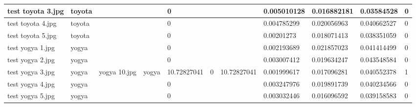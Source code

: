 \begin{landscape}
\begin{longtable}{|p{2cm}|p{1.5cm}|p{2cm}|p{1.5cm}|p{2cm}|p{1cm}|p{2cm}|p{2cm}|p{2cm}|p{2cm}|p{1cm}|}
		test toyota 3.jpg    & toyota           &                       &                             & 0                     &                         &                            & 0.005010128           & 0.016882181           & 0.03584528               & 0                \\ \hline
		test toyota 4.jpg    & toyota           &                       &                             & 0                     &                         &                            & 0.004785299           & 0.020056963           & 0.040662527              & 0                \\ \hline
		test toyota 5.jpg    & toyota           &                       &                             & 0                     &                         &                            & 0.00201273            & 0.018071413           & 0.038351059              & 0                \\ \hline
		test yogya 1.jpg     & yogya            &                       &                             & 0                     &                         &                            & 0.002193689           & 0.021857023           & 0.041414499              & 0                \\ \hline
		test yogya 2.jpg     & yogya            &                       &                             & 0                     &                         &                            & 0.003007412           & 0.019634247           & 0.043548584              & 0                \\ \hline
		test yogya 3.jpg     & yogya            & yogya 10.jpg          & yogya                       & 10.72827041           & 0                       & 10.72827041                & 0.001999617           & 0.017096281           & 0.040552378              & 1                \\ \hline
		test yogya 4.jpg     & yogya            &                       &                             & 0                     &                         &                            & 0.003247976           & 0.019891739           & 0.040234566              & 0                \\ \hline
		test yogya 5.jpg     & yogya            &                       &                             & 0                     &                         &                            & 0.003032446           & 0.016096592           & 0.039158583              & 0                \\ \hline
	\end{longtable}
\end{landscape}

